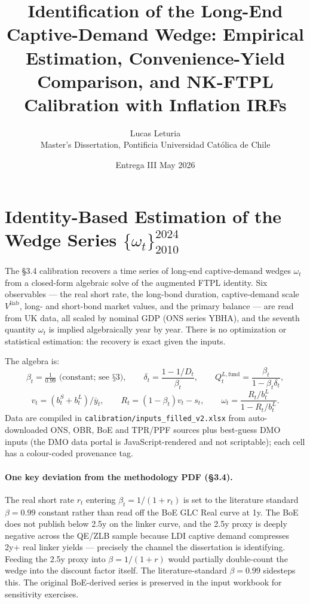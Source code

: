 \documentclass[11pt,a4paper]{article}
\title{Identification of the Long-End Captive-Demand Wedge: Empirical Estimation, Convenience-Yield Comparison, and NK-FTPL Calibration with Inflation IRFs}
\author{Lucas Leturia \\ \small Master's Dissertation, Pontificia Universidad Cat\'olica de Chile}
\date{Entrega III \textperiodcentered{} May 2026}
\begin{document}
\maketitle

\section{Identity-Based Estimation of the Wedge Series \texorpdfstring{$\{\omega_t\}_{2010}^{2024}$}{omega series}}

The §3.4 calibration recovers a time series of long-end captive-demand wedges $\omega_t$ from a closed-form algebraic solve of the augmented FTPL identity. Six observables --- the real short rate, the long-bond duration, captive-demand scale $V^{\text{liab}}$, long- and short-bond market values, and the primary balance --- are read from UK data, all scaled by nominal GDP (ONS series YBHA), and the seventh quantity $\omega_t$ is implied algebraically year by year. There is no optimization or statistical estimation: the recovery is exact given the inputs.

The algebra is:
\[
\beta_t = \tfrac{1}{0.99} \text{ (constant; see §3)}, \qquad
\delta_t = \frac{1 - 1/D_t}{\beta_t}, \qquad
Q^{L,\text{fund}}_t = \frac{\beta_t}{1-\beta_t \delta_t},
\]
\[
v_t = (b^S_t + b^L_t)/\bar y_t, \qquad
R_t = (1-\beta_t) v_t - s_t, \qquad
\omega_t = \frac{R_t / b^L_t}{1 - R_t / b^L_t}.
\]
Data are compiled in \texttt{calibration/inputs\_filled\_v2.xlsx} from auto-downloaded ONS, OBR, BoE and TPR/PPF sources plus best-guess DMO inputs (the DMO data portal is JavaScript-rendered and not scriptable); each cell has a colour-coded provenance tag.

\paragraph{One key deviation from the methodology PDF (§3.4).} The real short rate $r_t$ entering $\beta_t = 1/(1+r_t)$ is set to the literature standard $\beta = 0.99$ constant rather than read off the BoE GLC Real curve at 1y. The BoE does not publish below 2.5y on the linker curve, and the 2.5y proxy is deeply negative across the QE/ZLB sample because LDI captive demand compresses 2y+ real linker yields --- precisely the channel the dissertation is identifying. Feeding the 2.5y proxy into $\beta = 1/(1+r)$ would partially double-count the wedge into the discount factor itself. The literature-standard $\beta = 0.99$ sidesteps this. The original BoE-derived series is preserved in the input workbook for sensitivity exercises.
\end{document}
